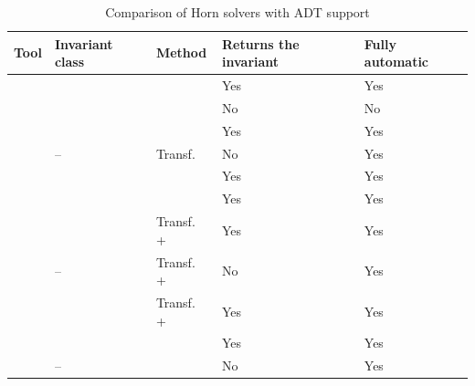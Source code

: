 \begin{table} [htbp]
    \centering\small
    \begin{threeparttable}%
        \caption{Comparison of Horn solvers with ADT support}\label{tab:hornSolvers}%
        \begin{tabular}{| m{50mm} || x{25mm} | x{25mm} | x{25mm} | x{25mm} |}
            \hline
            \hline
Tool & Invariant class & Method & Returns the invariant & Fully automatic\\\hline\hline
\spacer{} & \elemclass{} & \pdr{} & Yes & Yes\\
\racer{} & \catelemclass{} & \pdr{} & No & No\\
\eldarica{} & \sizeelemclass{} & \cegar{} & Yes & Yes\\
\vericat{} & -- & Transf. & No & Yes\\
\hoice{} & \elemclass{} & \ice{} & Yes & Yes\\
\rchc{}  & \syncRegFlatClass{} & \ice{} & Yes & Yes\\\hline
\ringen{\cvc} & \regclass{} & Transf. + \fmf{} & Yes & Yes\\
\ringen{\vampire} & -- & Transf. + \satur{} & No & Yes\\
\ringenSync{} & \syncRegFullClass{} & Transf. + \fmf{} & Yes & Yes\\
\ringenCICI{\cvc} & \regelemclass{} & \ourCEGAR{} & Yes & Yes\\
\ringenCICI{\vampire} & -- & \ourCEGAR{} & No & Yes\\
            \hline
            \hline
        \end{tabular}
    \end{threeparttable}
\end{table}

